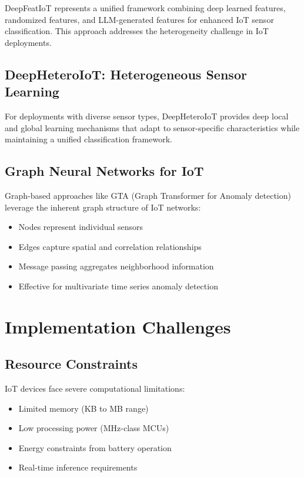 \documentclass[12pt,a4paper]{article}
\begin{document}
DeepFeatIoT represents a unified framework combining deep learned features, randomized features, and LLM-generated features for enhanced IoT sensor classification. This approach addresses the heterogeneity challenge in IoT deployments.

\subsection{DeepHeteroIoT: Heterogeneous Sensor Learning}

For deployments with diverse sensor types, DeepHeteroIoT provides deep local and global learning mechanisms that adapt to sensor-specific characteristics while maintaining a unified classification framework.

\subsection{Graph Neural Networks for IoT}

Graph-based approaches like GTA (Graph Transformer for Anomaly detection) leverage the inherent graph structure of IoT networks:
\begin{itemize}
    \item Nodes represent individual sensors
    \item Edges capture spatial and correlation relationships
    \item Message passing aggregates neighborhood information
    \item Effective for multivariate time series anomaly detection
\end{itemize}

\section{Implementation Challenges}

\subsection{Resource Constraints}

IoT devices face severe computational limitations:
\begin{itemize}
    \item Limited memory (KB to MB range)
    \item Low processing power (MHz-class MCUs)
    \item Energy constraints from battery operation
    \item Real-time inference requirements
\end{itemize}
\end{document}
